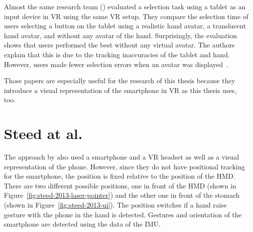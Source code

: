 Almost the same research team (\citeauthor{Afonso.2017}) evaluated a selection task using a tablet as an input device in \gls{VR} using the same \gls{VR} setup. They compare the selection time of users selecting a button on the tablet using a realistic hand avatar, a translucent hand avatar, and without any avatar of the hand. Surprisingly, the evaluation shows that users performed the best without any virtual avatar. The authors explain that this is due to the tracking inaccuracies of the tablet and hand. However, users made fewer selection errors when an avatar was displayed~\cite[247-248]{Afonso.2017}.

Those papers are especially useful for the research of this thesis because they introduce a visual representation of the smartphone in \gls{VR} as this thesis uses, too. 


\section{Steed at al.}\label{section:steed-2013}
The approach by \citeauthor{Steed.2013} also used a smartphone and a \gls{VR} headset as well as a visual representation of the phone. However, since they do not have positional tracking for the smartphone, the position is fixed relative to the position of the \gls{HMD}. There are two different possible positions, one in front of the \gls{HMD} (shown in Figure~\ref{fig:steed-2013-laser-pointer}) and the other one in front of the stomach (shown in Figure~\ref{fig:steed-2013-ui}). The position switches if a hand raise gesture with the phone in the hand is detected. Gestures and orientation of the smartphone are detected using the data of the \gls{IMU}.

